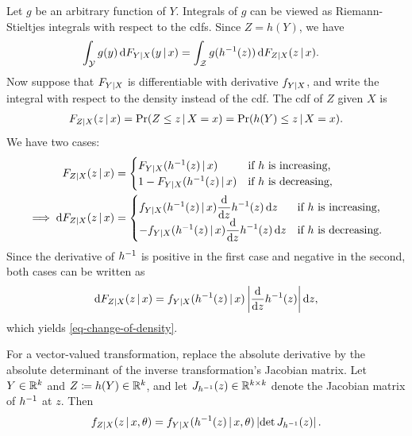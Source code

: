 \documentclass[a4paper,12pt]{article}
\begin{document}
\begin{remark}
	Let $g$ be an arbitrary function of $Y$.
	Integrals of $g$ can be viewed as Riemann-Stieltjes integrals with respect to the \glspl{cdf}.
	Since $Z=h(Y)$, we have
	\begin{align}
		\int_{\mathcal{Y}} g(y)\mathop{}\!{\mathrm{d}} F_{Y\mathpunct{}|\mathpunct{} X}(y\mathpunct{}|\mathpunct{} x)
		&=
		\int_{\mathcal{Z}} g(h^{-1}(z))\mathop{}\!{\mathrm{d}} F_{Z\mathpunct{}|\mathpunct{} X}(z\mathpunct{}|\mathpunct{} x).
	\end{align}
	Now suppose that $F_{Y\mathpunct{}|\mathpunct{} X}$ is differentiable with derivative $f_{Y\mathpunct{}|\mathpunct{} X}$,
	and write the integral with respect to the density instead of the \gls{cdf}.
	The \gls{cdf} of $Z$ given $X$ is
	\begin{align}
		F_{Z\mathpunct{}|\mathpunct{} X}(z\mathpunct{}|\mathpunct{} x)
		= \Pr(Z\le z\mathpunct{}|\mathpunct{} X=x)
		= \Pr(h(Y)\le z\mathpunct{}|\mathpunct{} X=x).
	\end{align}
	We have two cases:
	\begin{align}
		F_{Z\mathpunct{}|\mathpunct{} X}(z\mathpunct{}|\mathpunct{} x)
		&=
		\begin{cases}
			F_{Y\mathpunct{}|\mathpunct{} X}(h^{-1}(z)\mathpunct{}|\mathpunct{} x)
			& \text{if $h$ is increasing,} \\
			1-F_{Y\mathpunct{}|\mathpunct{} X}(h^{-1}(z)\mathpunct{}|\mathpunct{} x)
			& \text{if $h$ is decreasing,}
		\end{cases} \\
		\implies
		\mathop{}\!{\mathrm{d}} F_{Z\mathpunct{}|\mathpunct{} X}(z\mathpunct{}|\mathpunct{} x)
		&=
		\begin{cases}
			f_{Y\mathpunct{}|\mathpunct{} X}(h^{-1}(z)\mathpunct{}|\mathpunct{} x)
			\displaystyle\frac{\mathop{}\!{\mathrm{d}}}{\mathop{}\!{\mathrm{d}} z}h^{-1}(z)\mathop{}\!{\mathrm{d}} z
			& \text{if $h$ is increasing,} \\
			-f_{Y\mathpunct{}|\mathpunct{} X}(h^{-1}(z)\mathpunct{}|\mathpunct{} x)
			\displaystyle\frac{\mathop{}\!{\mathrm{d}}}{\mathop{}\!{\mathrm{d}} z}h^{-1}(z)\mathop{}\!{\mathrm{d}} z
			& \text{if $h$ is decreasing.}
		\end{cases}
	\end{align}
	Since the derivative of $h^{-1}$ is positive in the first case and negative
	in the second, both cases can be written as
	\begin{align}
		\mathop{}\!{\mathrm{d}} F_{Z\mathpunct{}|\mathpunct{} X}(z\mathpunct{}|\mathpunct{} x)
		=
		f_{Y\mathpunct{}|\mathpunct{} X}(h^{-1}(z)\mathpunct{}|\mathpunct{} x)
		\left|
			\frac{\mathop{}\!{\mathrm{d}}}{\mathop{}\!{\mathrm{d}} z}h^{-1}(z)
		\right|
		\mathop{}\!{\mathrm{d}} z,
	\end{align}
	which yields \eqref{eq-change-of-density}.
\end{remark}

\begin{remark}
	For a vector-valued transformation, replace the absolute derivative by the absolute determinant
	of the inverse transformation's Jacobian matrix.
	Let $Y\in\mathbb{R}^{k}$ and $Z\coloneqq h(Y)\in\mathbb{R}^{k}$, and let
	$J_{h^{-1}}(z)\in\mathbb{R}^{k\times k}$ denote the Jacobian matrix of $h^{-1}$ at $z$.
	Then
	\begin{align}
		f_{Z\mathpunct{}|\mathpunct{} X}(z\mathpunct{}|\mathpunct{} x,\theta)
		=f_{Y\mathpunct{}|\mathpunct{} X}(h^{-1}(z)\mathpunct{}|\mathpunct{} x,\theta)
		\left|\det J_{h^{-1}}(z)\right|.
	\end{align}
\end{remark}
\end{document}
